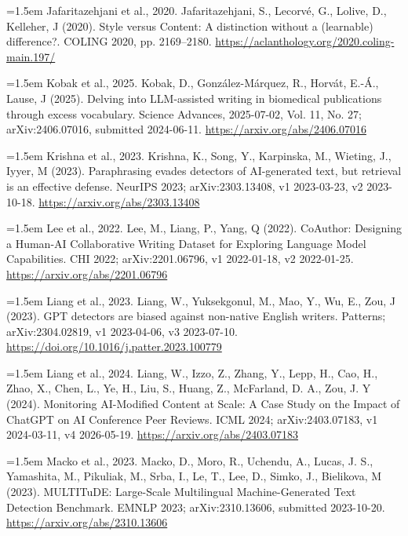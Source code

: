 \documentclass[11pt,a4paper]{article}
\renewcommand{\_}{\textunderscore\allowbreak}
\begin{document}
\noindent\hangindent=1.5em Jafaritazehjani et al., 2020. Jafaritazehjani, S., Lecorv\'e, G., Lolive, D., Kelleher, J (2020). Style versus Content: A distinction without a (learnable) difference?. COLING 2020, pp. 2169–2180. \url{https://aclanthology.org/2020.coling-main.197/}\par\smallskip

\noindent\hangindent=1.5em Kobak et al., 2025. Kobak, D., Gonz\'alez-M\'arquez, R., Horv\'at, E.-\'A., Lause, J (2025). Delving into LLM-assisted writing in biomedical publications through excess vocabulary. Science Advances, 2025-07-02, Vol. 11, No. 27; arXiv:2406.07016, submitted 2024-06-11. \url{https://arxiv.org/abs/2406.07016}\par\smallskip

\noindent\hangindent=1.5em Krishna et al., 2023. Krishna, K., Song, Y., Karpinska, M., Wieting, J., Iyyer, M (2023). Paraphrasing evades detectors of AI-generated text, but retrieval is an effective defense. NeurIPS 2023; arXiv:2303.13408, v1 2023-03-23, v2 2023-10-18. \url{https://arxiv.org/abs/2303.13408}\par\smallskip

\noindent\hangindent=1.5em Lee et al., 2022. Lee, M., Liang, P., Yang, Q (2022). CoAuthor: Designing a Human-AI Collaborative Writing Dataset for Exploring Language Model Capabilities. CHI 2022; arXiv:2201.06796, v1 2022-01-18, v2 2022-01-25. \url{https://arxiv.org/abs/2201.06796}\par\smallskip

\noindent\hangindent=1.5em Liang et al., 2023. Liang, W., Yuksekgonul, M., Mao, Y., Wu, E., Zou, J (2023). GPT detectors are biased against non-native English writers. Patterns; arXiv:2304.02819, v1 2023-04-06, v3 2023-07-10. \url{https://doi.org/10.1016/j.patter.2023.100779}\par\smallskip

\noindent\hangindent=1.5em Liang et al., 2024. Liang, W., Izzo, Z., Zhang, Y., Lepp, H., Cao, H., Zhao, X., Chen, L., Ye, H., Liu, S., Huang, Z., McFarland, D. A., Zou, J. Y (2024). Monitoring AI-Modified Content at Scale: A Case Study on the Impact of ChatGPT on AI Conference Peer Reviews. ICML 2024; arXiv:2403.07183, v1 2024-03-11, v4 2026-05-19. \url{https://arxiv.org/abs/2403.07183}\par\smallskip

\noindent\hangindent=1.5em Macko et al., 2023. Macko, D., Moro, R., Uchendu, A., Lucas, J. S., Yamashita, M., Pikuliak, M., Srba, I., Le, T., Lee, D., Simko, J., Bielikova, M (2023). MULTITuDE: Large-Scale Multilingual Machine-Generated Text Detection Benchmark. EMNLP 2023; arXiv:2310.13606, submitted 2023-10-20. \url{https://arxiv.org/abs/2310.13606}\par\smallskip
\end{document}
